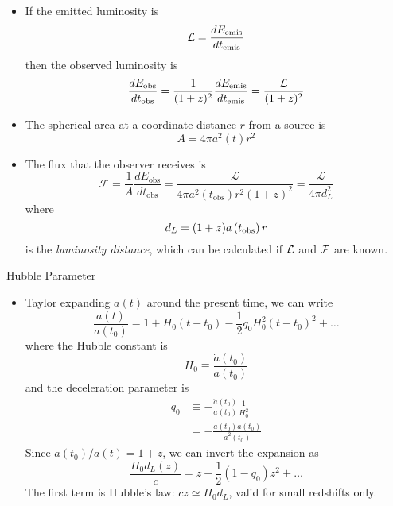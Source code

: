 \documentclass[size=11pt,style=paintings]{powerdot}
\begin{document}
  
  \begin{slide}{}
 \begin{itemize}
 \item If the emitted luminosity is 
 \vskip -0.2cm
 $${\cal L} = \frac{dE_{\rm emis}}{d t_{\rm emis}}$$ 
 then the observed luminosity is
  \vskip -0.2cm
 $$
\frac{d E_{\mathrm{obs}}}{d t_{\mathrm{obs}}}=\frac{1}{(1+z)^{2}} \frac{d E_{\rm emis}}{d t_{\rm emis}} = \frac{{\cal L}}{(1+z)^{2}}
$$

\item The spherical area at a coordinate distance $r$ from a source is 
 \vskip -0.2cm
$$
A=4 \pi a^2(t) r^2 
$$
 \vskip -0.1cm
\item
The flux that the observer receives is 
$$
\boxed{\mathcal{F}=\frac{1}{A}\frac{d E_{\mathrm{obs}}}{d t_{\mathrm{obs}}}=\frac{\mathcal{L}}
{4 \pi a^{2}\left(t_{\mathrm{obs}}\right) r^{2}(1+z)^{2}}=\frac{\mathcal{L}}{4
\pi d_L^2}}
$$
 \vskip -0.2cm
where 
 \vskip -0.7cm
 $$
d_{L}=(1+z) a\left(t_{\rm obs}\right) r
$$
is the \textit{luminosity distance}, which can be calculated if ${\cal L}$ and ${\cal F}$ are known.
 \end{itemize}

 \end{slide}
 
  
  \begin{slide}{Hubble Parameter}
  
 \begin{itemize}
 \item Taylor expanding $a(t)$ around the present time, we can write
 \vskip -0.2cm
 $$
\frac{a(t)}{a\left(t_{0}\right)}=1+H_{0}\left(t-t_{0}\right)-\frac{1}{2} q_{0} H_{0}^{2}\left(t-t_{0}\right)^{2}+\ldots
$$
where the Hubble constant is
\vskip -0.4cm
$$
H_{0} \equiv \frac{\dot{a}\left(t_{0}\right)}{a\left(t_{0}\right)}
$$
\vskip -0.2cm
and the deceleration parameter is
\vskip -0.2cm
$$
\begin{aligned} q_{0} & \equiv-\frac{\ddot{a}\left(t_{0}\right)}{a\left(t_{0}\right)} \frac{1}{H_{0}^{2}} \\ &=-\frac{a\left(t_{0}\right) \ddot{a}\left(t_{0}\right)}{\dot{a}^{2}\left(t_{0}\right)} \end{aligned}
$$
\vskip -0.1cm
Since $ a\left(t_{0}\right) / a(t)=1+z$, we can invert the expansion as
$$
\boxed{\frac{H_{0} d_{L}(z)}{c}=z+\frac{1}{2}\left(1-q_{0}\right) z^{2}+\ldots}
$$
The first term is Hubble's law: $ cz \simeq H_{0} d_{L}$, valid for small redshifts only.
 \end{itemize}
 \end{slide}
 
\end{document}

